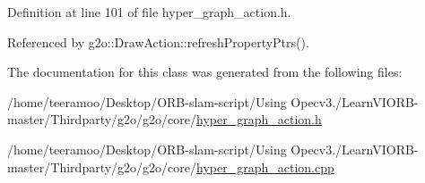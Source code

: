 Definition at line 101 of file hyper\+\_\+graph\+\_\+action.\+h.



Referenced by g2o\+::\+Draw\+Action\+::refresh\+Property\+Ptrs().



The documentation for this class was generated from the following files\+:\begin{DoxyCompactItemize}
\item 
/home/teeramoo/\+Desktop/\+O\+R\+B-\/slam-\/script/\+Using Opecv3./\+Learn\+V\+I\+O\+R\+B-\/master/\+Thirdparty/g2o/g2o/core/\hyperlink{hyper__graph__action_8h}{hyper\+\_\+graph\+\_\+action.\+h}\item 
/home/teeramoo/\+Desktop/\+O\+R\+B-\/slam-\/script/\+Using Opecv3./\+Learn\+V\+I\+O\+R\+B-\/master/\+Thirdparty/g2o/g2o/core/\hyperlink{hyper__graph__action_8cpp}{hyper\+\_\+graph\+\_\+action.\+cpp}\end{DoxyCompactItemize}
